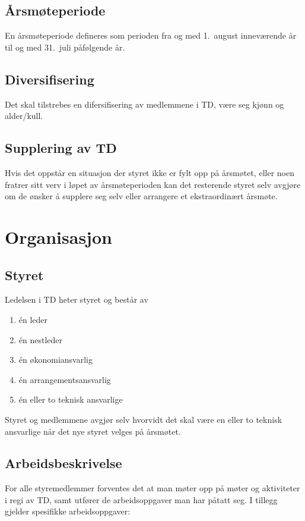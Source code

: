 \documentclass[11pt]{article}
\begin{document}
\subsection{Årsmøteperiode}
En årsmøteperiode defineres som perioden fra og med 1.\ august inneværende år til og med 31.\ juli påfølgende år.

\subsection{Diversifisering}
Det skal tilstrebes en difersifisering av medlemmene i TD, være seg kjønn og alder/kull.

\subsection{Supplering av TD}
Hvis det oppstår en situasjon der styret ikke er fylt opp på årsmøtet, eller noen fratrer sitt verv i løpet av årsmøteperioden kan det resterende styret selv avgjøre om de ønsker å supplere seg selv eller arrangere et ekstraordinært årsmøte.

\section{Organisasjon}
\subsection{Styret}
Ledelsen i TD heter styret og består av
\begin{enumerate}
	\item én leder
	\item én nestleder
	\item én økonomiansvarlig
	\item én arrangementsansvarlig
	\item én eller to teknisk ansvarlige
\end{enumerate}

Styret og medlemmene avgjør selv hvorvidt det skal være en eller to teknisk ansvarlige når det nye styret velges på årsmøtet.

\subsection{Arbeidsbeskrivelse}
For alle styremedlemmer forventes det at man møter opp på møter og aktiviteter i regi av TD, samt utfører de arbeidsoppgaver man har påtatt seg. I tillegg gjelder spesifikke arbeidsoppgaver:
\end{document}
